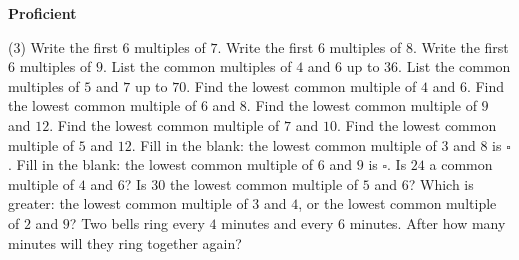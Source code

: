 \documentclass[17pt,a4paper,landscape]{extarticle}
\begin{document}
\sffamily
\boldmath

\boldmath

{\LARGE \textbf{Proficient}}
\begin{tasks}(3)
\task Write the first 6 multiples of \mbox{$7$}.
\task Write the first 6 multiples of \mbox{$8$}.
\task Write the first 6 multiples of \mbox{$9$}.
\task List the common multiples of \mbox{$4$} and \mbox{$6$} up to \mbox{$36$}.
\task List the common multiples of \mbox{$5$} and \mbox{$7$} up to \mbox{$70$}.
\task Find the lowest common multiple of \mbox{$4$} and \mbox{$6$}.
\task Find the lowest common multiple of \mbox{$6$} and \mbox{$8$}.
\task Find the lowest common multiple of \mbox{$9$} and \mbox{$12$}.
\task Find the lowest common multiple of \mbox{$7$} and \mbox{$10$}.
\task Find the lowest common multiple of \mbox{$5$} and \mbox{$12$}.
\task Fill in the blank: the lowest common multiple of \mbox{$3$} and \mbox{$8$} is \mbox{$\square$}.
\task Fill in the blank: the lowest common multiple of \mbox{$6$} and \mbox{$9$} is \mbox{$\square$}.
\task Is \mbox{$24$} a common multiple of \mbox{$4$} and \mbox{$6$}?
\task Is \mbox{$30$} the lowest common multiple of \mbox{$5$} and \mbox{$6$}?
\task Which is greater: the lowest common multiple of \mbox{$3$} and \mbox{$4$}, or the lowest common multiple of \mbox{$2$} and \mbox{$9$}?
\task Two bells ring every \mbox{$4$} minutes and every \mbox{$6$} minutes. After how many minutes will they ring together again?
\end{tasks}
\end{document}
